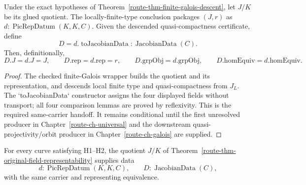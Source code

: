 \begin{theorem}
  \label{route-thm-public-handoff}
  \leanok

  Under the exact hypotheses of
  Theorem~\ref{route-thm-finite-galois-descent}, let \(J/K\) be its glued
  quotient.  The locally-finite-type conclusion packages
  \((J,r)\) as \(d:\operatorname{PicRepDatum}(K,K,C)\).  Given the descended
  quasi-compactness certificate, define
  \[
    D=d.\operatorname{toJacobianData}:
       \operatorname{JacobianData}(C).
  \]
  Then, definitionally,
  \[
    D.J=d.J=J,\qquad D.\mathrm{rep}=d.\mathrm{rep}=r,
    \qquad D.\mathrm{grpObj}=d.\mathrm{grpObj},
    \qquad D.\mathrm{homEquiv}=d.\mathrm{homEquiv}.
  \]
\end{theorem}

\begin{proof}
  The checked finite-Galois wrapper builds the quotient and its representation,
  and descends local finite type and quasi-compactness from \(J_L\).  The
  `toJacobianData` constructor assigns the four displayed fields without
  transport; all four comparison lemmas are proved by reflexivity.  This is
  the required same-carrier handoff.  It remains conditional until the first
  unresolved producer in Chapter~\ref{route-ch-universal} and the downstream
  quasi-projectivity/orbit producer in Chapter~\ref{route-ch-galois} are supplied.
\end{proof}

\begin{corollary}
  \label{route-cor-original-field-data}
  \notready

  For every curve satisfying H1--H2, the quotient \(J/K\) of
  Theorem~\ref{route-thm-original-field-representability} supplies data
  \[
    d:\operatorname{PicRepDatum}(K,K,C),\qquad
    D:\operatorname{JacobianData}(C),
  \]
  with the same carrier and representing equivalence.
\end{corollary}

